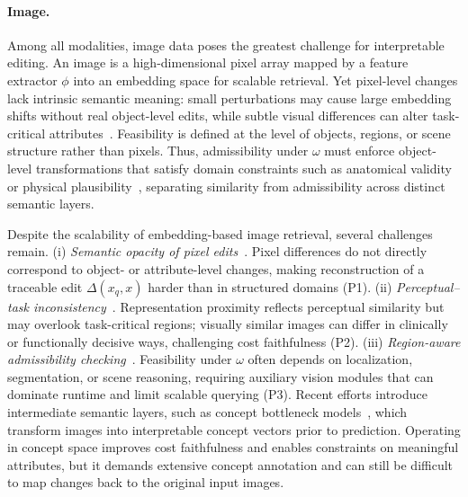 \paragraph{Image.}
Among all modalities, image data poses the greatest challenge for interpretable editing. An image is a high-dimensional pixel array mapped by a feature extractor $\phi$ into an embedding space for scalable retrieval. Yet pixel-level changes lack intrinsic semantic meaning: small perturbations may cause large embedding shifts without real object-level edits, while subtle visual differences can alter task-critical attributes~\cite{narodytska2017simple}. Feasibility is defined at the level of objects, regions, or scene structure rather than pixels. Thus, admissibility under $\omega$ must enforce object-level transformations that satisfy domain constraints such as anatomical validity or physical plausibility~\cite{nam2026causal}, separating similarity from admissibility across distinct semantic layers.

Despite the scalability of embedding-based image retrieval, several challenges remain. (i) \emph{Semantic opacity of pixel edits}~\cite{assran2023self}. Pixel differences do not directly correspond to object- or attribute-level changes, making reconstruction of a traceable edit $\Delta(x_q,x)$ harder than in structured domains (P1). (ii) \emph{Perceptual–task inconsistency}~\cite{zhang2021multi}. Representation proximity reflects perceptual similarity but may overlook task-critical regions; visually similar images can differ in clinically or functionally decisive ways, challenging cost faithfulness (P2). (iii) \emph{Region-aware admissibility checking}~\cite{gagliardi2025region}. Feasibility under $\omega$ often depends on localization, segmentation, or scene reasoning, requiring auxiliary vision modules that can dominate runtime and limit scalable querying (P3). Recent efforts introduce intermediate semantic layers, such as concept bottleneck models~\cite{de2025causally,koh2020concept,dominici2025counterfactual}, which transform images into interpretable concept vectors prior to prediction. Operating in concept space improves cost faithfulness and enables constraints on meaningful attributes, but it demands extensive concept annotation and can still be difficult to map changes back to the original input images.


